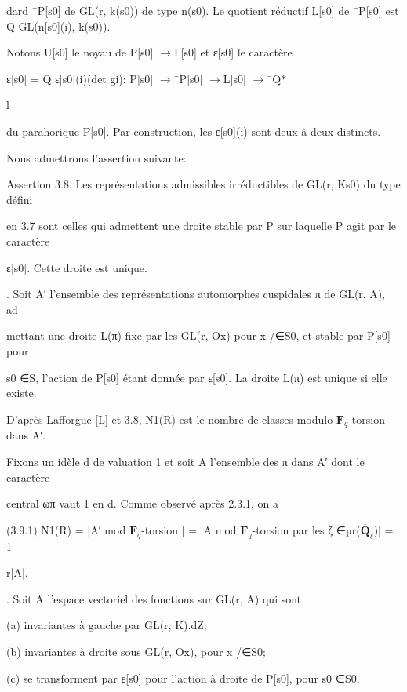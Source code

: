 \documentclass[11pt]{article}
\begin{document}
\noindent dard ¯P[s0] de GL(r, k(s0)) de type n(s0). Le quotient réductif L[s0] de ¯P[s0] est Q GL(n[s0](i), k(s0)).\par
\noindent Notons U[s0] le noyau de P[s0] \(\to\)L[s0] et ε[s0] le caractère\par
\noindent ε[s0] = Q ε[s0](i)(det gi): P[s0] \(\to\)¯P[s0] \(\to\)L[s0] \(\to\)¯Q\(*\)\par
\noindent l\par
\noindent du parahorique P[s0]. Par construction, les ε[s0](i) sont deux à deux distincts.\par
\noindent Nous admettrons l’assertion suivante:\par
\noindent Assertion 3.8. Les représentations admissibles irréductibles de GL(r, Ks0) du type défini\par
\noindent en 3.7 sont celles qui admettent une droite stable par P sur laquelle P agit par le caractère\par
\noindent ε[s0]. Cette droite est unique.\par
{}. Soit A′ l’ensemble des représentations automorphes cuspidales π de GL(r, A), ad-\par
\noindent mettant une droite L(π) fixe par les GL(r, Ox) pour x /∈S0, et stable par P[s0] pour\par
\noindent s0 ∈S, l’action de P[s0] étant donnée par ε[s0]. La droite L(π) est unique si elle existe.\par
\noindent D’après Lafforgue [L] et 3.8, N1(R) est le nombre de classes modulo \(\mathbf F_q\)-torsion dans A′.\par
\noindent Fixons un idèle d de valuation 1 et soit A l’ensemble des π dans A′ dont le caractère\par
\noindent central ωπ vaut 1 en d. Comme observé après 2.3.1, on a\par
\noindent (3.9.1) N1(R) = |A′ mod \(\mathbf F_q\)-torsion | = |A mod \(\mathbf F_q\)-torsion par les ζ ∈µr(\(\overline{\mathbf Q}_{\ell}\))| = 1\par
\noindent r|A|.\par
{}. Soit A l’espace vectoriel des fonctions sur GL(r, A) qui sont\par
\medskip
\noindent (a) invariantes à gauche par GL(r, K).dZ;\par
\noindent (b) invariantes à droite sous GL(r, Ox), pour x /∈S0;\par
\noindent (c) se transforment par ε[s0] pour l’action à droite de P[s0], pour s0 ∈S0.\par
\end{document}
